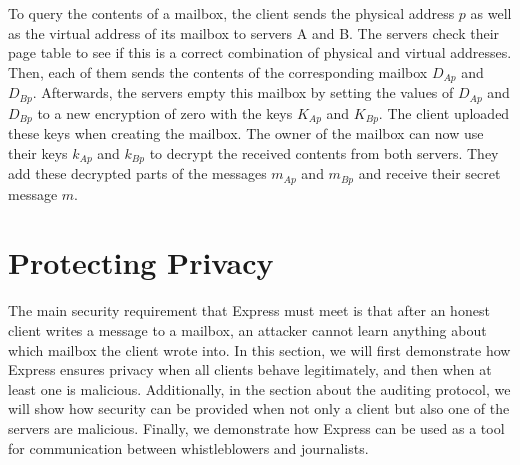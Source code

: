 \documentclass[a4paper]{article}
\begin{document}
To query the contents of a mailbox, the client sends the physical address $p$ as well as the virtual address of its mailbox to servers A and B. The servers check their page table to see if this is a correct combination of physical and virtual addresses. Then, each of them sends the contents of the corresponding mailbox $D_{Ap}$ and $D_{Bp}$. Afterwards, the servers empty this mailbox by setting the values of $D_{Ap}$ and $D_{Bp}$ to a new encryption of zero with the keys $K_{Ap}$ and $K_{Bp}$. The client uploaded these keys when creating the mailbox. The owner of the mailbox can now use their keys $k_{Ap}$ and $k_{Bp}$ to decrypt the received contents from both servers. They add these decrypted parts of the messages $m_{Ap}$ and $m_{Bp}$ and receive their secret message $m$. 

\section{Protecting Privacy} %
\label{sec:protecting}
The main security requirement that Express must meet is that after an honest client writes a message to a mailbox, an attacker cannot learn anything about which mailbox the client wrote into. 
In this section, we will first demonstrate how Express ensures privacy when all clients behave legitimately, and then when at least one is malicious. Additionally, in the section about the auditing protocol, we will show how security can be provided when not only a client but also one of the servers are malicious. Finally, we demonstrate how Express can be used as a tool for communication between whistleblowers and journalists.  
\end{document}

